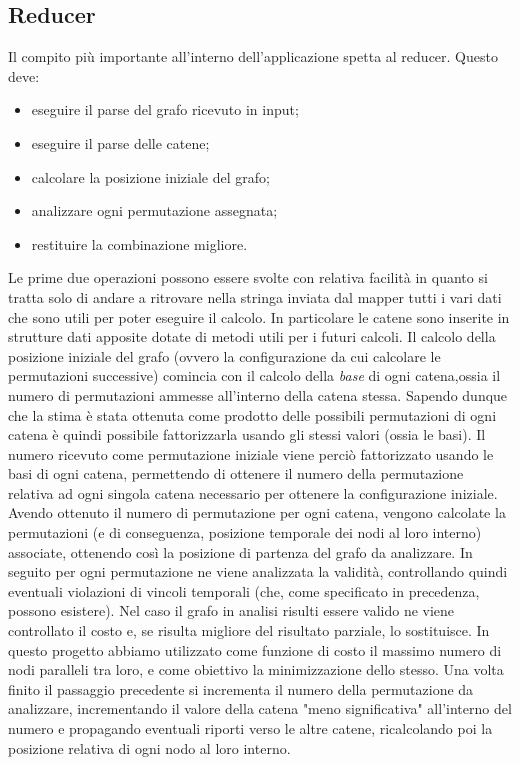 \documentclass[]{IEEEtran}
\begin{document}
\subsection{Reducer}
Il compito più importante all'interno dell'applicazione spetta al reducer. Questo deve:
\begin{itemize}
	\item eseguire il parse del grafo ricevuto in input;
	\item eseguire il parse delle catene;
	\item calcolare la posizione iniziale del grafo;
	\item analizzare ogni permutazione assegnata;
	\item restituire la combinazione migliore.
\end{itemize}
Le prime due operazioni possono essere svolte con relativa facilità in quanto si tratta solo di andare a ritrovare nella stringa inviata dal mapper tutti i vari dati che sono utili per poter eseguire il calcolo. In particolare le catene sono inserite in strutture dati apposite dotate di metodi utili per i futuri calcoli. 
Il calcolo della posizione iniziale del grafo (ovvero la configurazione da cui calcolare le permutazioni successive) comincia con il calcolo della \emph{base} di ogni catena,ossia il numero di permutazioni ammesse all'interno della catena stessa. Sapendo dunque che la stima è stata ottenuta come prodotto delle possibili permutazioni di ogni catena è quindi possibile fattorizzarla usando gli stessi valori (ossia le basi). Il numero ricevuto come permutazione iniziale viene perciò fattorizzato usando le basi di ogni catena, permettendo di ottenere il numero della permutazione relativa ad ogni singola catena necessario per ottenere la configurazione iniziale. Avendo ottenuto il numero di permutazione per ogni catena, vengono calcolate la permutazioni (e di conseguenza, posizione temporale dei nodi al loro interno) associate, ottenendo così la posizione di partenza del grafo da analizzare.
In seguito per ogni permutazione ne viene analizzata la validità, controllando quindi eventuali violazioni di vincoli temporali (che, come specificato in precedenza, possono esistere). Nel caso il grafo in analisi risulti essere valido ne viene controllato il costo e, se risulta migliore del risultato parziale, lo sostituisce. 
In questo progetto abbiamo utilizzato come funzione di costo il massimo numero di nodi paralleli tra loro, e come obiettivo la minimizzazione dello stesso.
Una volta finito il passaggio precedente si incrementa il numero della permutazione da analizzare, incrementando il valore della catena "meno significativa" all'interno del numero e propagando eventuali riporti verso le altre catene, ricalcolando poi la posizione relativa di ogni nodo al loro interno.
\end{document}
